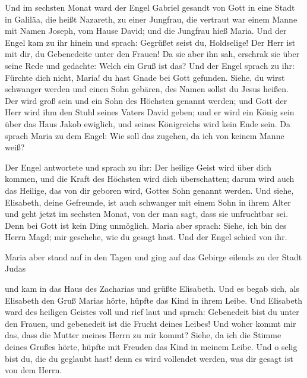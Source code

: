  Und im sechsten Monat ward der Engel Gabriel gesandt von
Gott in eine Stadt in Galiläa, die heißt Nazareth,  zu
einer Jungfrau, die vertraut war einem Manne mit Namen Joseph, vom Hause
David; und die Jungfrau hieß Maria.  Und der Engel kam zu
ihr hinein und sprach: Gegrüßet seist du, Holdselige! Der Herr ist mit
dir, du Gebenedeite unter den Frauen!  Da sie aber ihn
sah, erschrak sie über seine Rede und gedachte: Welch ein Gruß ist das?
 Und der Engel sprach zu ihr: Fürchte dich nicht, Maria!
du hast Gnade bei Gott gefunden.  Siehe, du wirst
schwanger werden und einen Sohn gebären, des Namen sollst du Jesus
heißen.  Der wird groß sein und ein Sohn des Höchsten
genannt werden; und Gott der Herr wird ihm den Stuhl seines Vaters David
geben;  und er wird ein König sein über das Haus Jakob
ewiglich, und seines Königreichs wird kein Ende sein.  Da
sprach Maria zu dem Engel: Wie soll das zugehen, da ich von keinem Manne
weiß?

 Der Engel antwortete und sprach zu ihr: Der heilige
Geist wird über dich kommen, und die Kraft des Höchsten wird dich
überschatten; darum wird auch das Heilige, das von dir geboren wird,
Gottes Sohn genannt werden.  Und siehe, Elisabeth, deine
Gefreunde, ist auch schwanger mit einem Sohn in ihrem Alter und geht
jetzt im sechsten Monat, von der man sagt, dass sie unfruchtbar sei.
 Denn bei Gott ist kein Ding unmöglich. 
Maria aber sprach: Siehe, ich bin des Herrn Magd; mir geschehe, wie du
gesagt hast. Und der Engel schied von ihr.

 Maria aber stand auf in den Tagen und ging auf das
Gebirge eilends zu der Stadt Judas

 und kam in das Haus des Zacharias und grüßte Elisabeth.
 Und es begab sich, als Elisabeth den Gruß Marias hörte,
hüpfte das Kind in ihrem Leibe. Und Elisabeth ward des heiligen Geistes
voll  und rief laut und sprach: Gebenedeit bist du unter
den Frauen, und gebenedeit ist die Frucht deines Leibes! 
Und woher kommt mir das, dass die Mutter meines Herrn zu mir kommt?
 Siehe, da ich die Stimme deines Grußes hörte, hüpfte mit
Freuden das Kind in meinem Leibe.  Und o selig bist du,
die du geglaubt hast! denn es wird vollendet werden, was dir gesagt ist
von dem Herrn.

